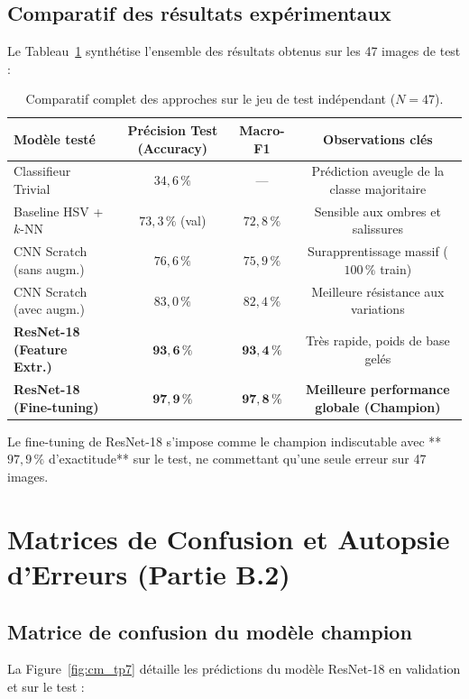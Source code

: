 \documentclass[11pt,a4paper]{article}
\begin{document}
\subsection{Comparatif des résultats expérimentaux}
Le Tableau~\ref{tab:resultats_tp7} synthétise l'ensemble des résultats obtenus sur les 47 images de test :

\begin{table}[H]
    \centering
    \begin{tabular}{lccc}
        \toprule
        \textbf{Modèle testé} & \textbf{Précision Test (Accuracy)} & \textbf{Macro-F1} & \textbf{Observations clés} \\
        \midrule
        Classifieur Trivial & $34{,}6\,\%$ & — & Prédiction aveugle de la classe majoritaire \\
        Baseline HSV + $k$-NN & $73{,}3\,\%$ (val) & $72{,}8\,\%$ & Sensible aux ombres et salissures \\
        CNN Scratch (sans augm.) & $76{,}6\,\%$ & $75{,}9\,\%$ & Surapprentissage massif ($100\,\%$ train) \\
        CNN Scratch (avec augm.) & $83{,}0\,\%$ & $82{,}4\,\%$ & Meilleure résistance aux variations \\
        \textbf{ResNet-18 (Feature Extr.)} & $\mathbf{93{,}6\,\%}$ & $\mathbf{93{,}4\,\%}$ & Très rapide, poids de base gelés \\
        \textbf{ResNet-18 (Fine-tuning)} & $\mathbf{97{,}9\,\%}$ & $\mathbf{97{,}8\,\%}$ & \textbf{Meilleure performance globale (Champion)} \\
        \bottomrule
    \end{tabular}
    \caption{Comparatif complet des approches sur le jeu de test indépendant ($N=47$).}
    \label{tab:resultats_tp7}
\end{table}

Le fine-tuning de ResNet-18 s'impose comme le champion indiscutable avec **$97{,}9\,\%$ d'exactitude** sur le test, ne commettant qu'une seule erreur sur 47 images.

\newpage
\section{Matrices de Confusion et Autopsie d'Erreurs (Partie B.2)}

\subsection{Matrice de confusion du modèle champion}
La Figure~\ref{fig:cm_tp7} détaille les prédictions du modèle ResNet-18 en validation et sur le test :
\end{document}
